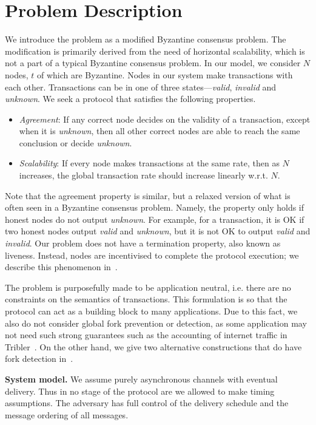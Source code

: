 \section{Problem Description}
\label{sec:description}
We introduce the problem as a modified Byzantine consensus problem.
The modification is primarily derived from the need of horizontal scalability,
which is not a part of a typical Byzantine consensus problem.
In our model, we consider $N$ nodes, $t$ of which are Byzantine.
Nodes in our system make transactions with each other.
Transactions can be in one of three states---\emph{valid}, \emph{invalid} and \emph{unknown}.
We seek a protocol that satisfies the following properties.
\begin{itemize}
    \item \emph{Agreement}:
        If any correct node decides on the validity of a transaction, except when it is \emph{unknown},
        then all other correct nodes are able to reach the same conclusion or decide \emph{unknown}.
    \item \emph{Scalability}:
        If every node makes transactions at the same rate,
        then as $N$ increases,
        the global transaction rate should increase linearly w.r.t. $N$.
\end{itemize}

Note that the agreement property is similar, but a relaxed version of what is often seen in a Byzantine consensus problem.
Namely, the property only holds if honest nodes do not output \emph{unknown}.
For example, for a transaction, it is OK if two honest nodes output \emph{valid} and \emph{unknown}, but it is not OK to output \emph{valid} and \emph{invalid}.
Our problem does not have a termination property, also known as liveness.
Instead, nodes are incentivised to complete the protocol execution;
we describe this phenomenon in~.

The problem is purposefully made to be application neutral,
i.e. there are no constraints on the semantics of transactions.
This formulation is so that the protocol can act as a building block to many applications.
Due to this fact, we also do not consider global fork prevention or detection,
as some application may not need such strong guarantees such as the accounting of internet traffic in Tribler~\cite{pimotte, pouwelse2008tribler}.
On the other hand, we give two alternative constructions that do have fork detection in~.

\textbf{System model.\quad}
We assume purely asynchronous channels with eventual delivery.
Thus in no stage of the protocol are we allowed to make timing assumptions.
The adversary has full control of the delivery schedule and the message ordering of all messages.

